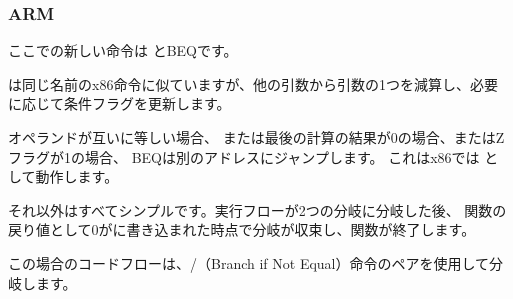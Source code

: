 \subsubsection{ARM}





ここでの新しい命令は \CMP と\ac{BEQ}です。

\CMP は同じ名前のx86命令に似ていますが、他の引数から引数の1つを減算し、必要に応じて条件フラグを更新します。

オペランドが互いに等しい場合、
または最後の計算の結果が0の場合、またはZフラグが1の場合、
\ac{BEQ}は別のアドレスにジャンプします。
これはx86では \JZ として動作します。

それ以外はすべてシンプルです。実行フローが2つの分岐に分岐した後、
関数の戻り値として0がに書き込まれた時点で分岐が収束し、関数が終了します。




この場合のコードフローは、/（Branch if Not Equal）命令のペアを使用して分岐します。
